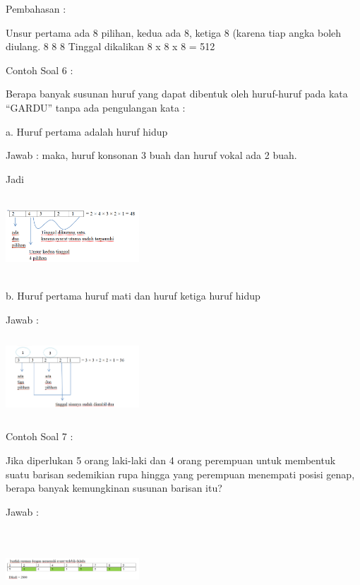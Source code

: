 \documentclass[11pt,fleqn]{book} %
\begin{document}
Pembahasan :

Unsur pertama ada 8 pilihan, kedua ada 8, ketiga 8 (karena tiap angka boleh diulang.
                                    8          8          8                      
                                    Tinggal dikalikan
                                                                                    8 x 8 x 8 = 512

Contoh Soal 6 :

Berapa banyak susunan huruf yang dapat dibentuk oleh huruf-huruf pada kata “GARDU” tanpa ada pengulangan kata :

a.  Huruf pertama adalah huruf hidup

Jawab : maka, huruf konsonan 3 buah dan huruf vokal ada 2 buah. 

Jadi

\includegraphics[width = 5cm, height=3cm]{Pictures/soalkaidah1.png}


b.      Huruf pertama huruf mati dan huruf ketiga huruf hidup

Jawab :

\includegraphics[width = 5cm, height=3cm]{Pictures/soalkaidah2.png}

Contoh Soal 7 :

Jika diperlukan 5 orang laki-laki dan 4 orang perempuan untuk membentuk suatu barisan sedemikian rupa hingga yang perempuan menempati posisi genap, berapa banyak kemungkinan susunan barisan itu?

Jawab :

\includegraphics[width = 5cm, height=3cm]{Pictures/soalkaidah3.png}
\end{document}
